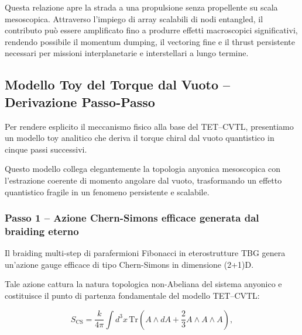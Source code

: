 \documentclass[11pt,a4paper]{article}
\theoremstyle{plain}
\theoremstyle{definition}
\begin{document}
Questa relazione apre la strada a una propulsione senza propellente su scala mesoscopica. Attraverso l'impiego di array scalabili di nodi entangled, il contributo può essere amplificato fino a produrre effetti macroscopici significativi, rendendo possibile il momentum dumping, il vectoring fine e il thrust persistente necessari per missioni interplanetarie e interstellari a lungo termine.






\vspace{0.7cm}




\subsection{Modello Toy del Torque dal Vuoto – Derivazione Passo-Passo}

Per rendere esplicito il meccanismo fisico alla base del TET--CVTL, presentiamo un modello toy analitico che deriva il torque chiral dal vuoto quantistico in cinque passi successivi. 


\vspace{0.2cm}

Questo modello collega elegantemente la topologia anyonica mesoscopica con l'estrazione coerente di momento angolare dal vuoto, trasformando un effetto quantistico fragile in un fenomeno persistente e scalabile.


\vspace{0.3cm}




\subsubsection{Passo 1 – Azione Chern-Simons efficace generata dal braiding eterno}

Il braiding multi-step di parafermioni Fibonacci in eterostrutture TBG genera un'azione gauge efficace di tipo Chern-Simons in dimensione (2+1)D. 

\vspace{0.2cm}


\begin{tcolorbox}[
    colback=blue!5!white,
    colframe=blue!60!black,
    coltitle=white,
    fonttitle=\bfseries,
    title=Azione Chern-Simons e Natura Topologica Non-Abeliana,
    sharp corners,
    boxrule=0.8pt,
    enhanced,
    attach boxed title to top left={xshift=12pt, yshift=-3mm},
    boxed title style={colback=blue!80!cyan}
]

Tale azione cattura la natura topologica non-Abeliana del sistema anyonico e costituisce il punto di partenza fondamentale del modello TET–CVTL:

\begin{equation}
S_{\text{CS}} = \frac{k}{4\pi} \int d^3x \, \text{Tr}\left( A \wedge dA + \frac{2}{3} A \wedge A \wedge A \right),
\label{eq:CS_action}
\end{equation}



\end{tcolorbox}
\end{document}

